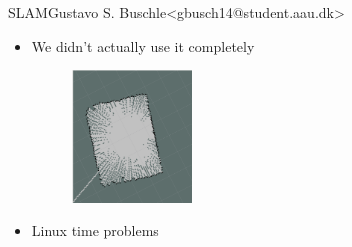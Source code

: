 \begin{frame}{SLAM}{Gustavo S. Buschle\newline<gbusch14@student.aau.dk>}
    \begin{itemize}
        \item <1-> We didn't actually use it completely
        \begin{figure}[h!]
            \includegraphics[width=0.3\textwidth]{images/hector.png}
        \end{figure}
        \item <2-> Linux time problems
    \end{itemize}
\end{frame}
